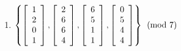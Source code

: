 \begin{enumerate}[!HW!,label=$\spadesuit$ \arabic*., ref=\arabic*]
\item%
\label{exer:LIrealstop} $\left\{\vr{1\\2\\0\\1}, \vr{2\\6\\6\\4}, \vr{6\\5\\1\\1}, \vr{0\\5\\4\\4}\right\} \pmod 7$
\end{enumerate}

\pagebreak